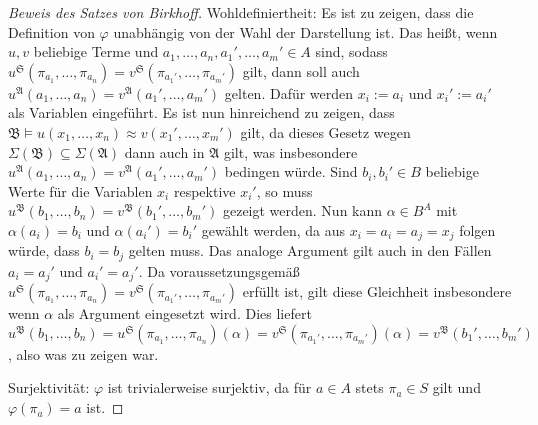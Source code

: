 \begin{proof}[Beweis des Satzes von Birkhoff]
    Wohldefiniertheit: Es ist zu zeigen, dass die Definition von $\varphi$ unabhängig von der Wahl der Darstellung ist.
    Das heißt, wenn $u,v$ beliebige Terme und $a_1,\ldots,a_n,a_1',\ldots,a_m'\in A$ sind, sodass $u^\mathfrak{S}(\pi_{a_1},\ldots,\pi_{a_n})=v^\mathfrak{S}(\pi_{a_1'},\ldots,\pi_{a_m'})$ gilt,
    dann soll auch $u^\mathfrak{A}(a_1,\ldots,a_n)=v^\mathfrak{A}(a_1',\ldots,a_m')$ gelten.
    Dafür werden $x_i:=a_i$ und $x_i':=a_i'$ als Variablen eingeführt. Es ist nun hinreichend zu zeigen, dass
    $\mathfrak{B}\models u(x_1,\ldots,x_n)\approx v(x_1',\ldots,x_m')$ gilt, da dieses Gesetz wegen $\Sigma(\mathfrak{B})\subseteq \Sigma(\mathfrak{A})$
    dann auch in $\mathfrak{A}$ gilt, was insbesondere $u^\mathfrak{A}(a_1,\ldots,a_n)=v^\mathfrak{A}(a_1',\ldots,a_m')$ bedingen würde.
    Sind $b_i,b_i'\in B$ beliebige Werte für die Variablen $x_i$ respektive $x_i'$, so muss $u^\mathfrak{B}(b_1,\ldots,b_n)=v^\mathfrak{B}(b_1',\ldots,b_m')$
    gezeigt werden. Nun kann $\alpha\in B^A$ mit $\alpha(a_i)=b_i$ und $\alpha(a_i')=b_i'$ gewählt werden,
    da aus $x_i=a_i=a_j=x_j$ folgen würde, dass $b_i=b_j$ gelten muss. Das analoge Argument gilt auch in den Fällen
    $a_i=a_j'$ und $a_i'=a_j'$. Da voraussetzungsgemäß $u^\mathfrak{S}(\pi_{a_1},\ldots,\pi_{a_n})=v^\mathfrak{S}(\pi_{a_1'},\ldots,\pi_{a_m'})$ erfüllt ist,
    gilt diese Gleichheit insbesondere wenn $\alpha$ als Argument eingesetzt wird. Dies liefert
    $u^\mathfrak{B}(b_1,\ldots,b_n)=u^\mathfrak{S}(\pi_{a_1},\ldots,\pi_{a_n})(\alpha)=v^\mathfrak{S}(\pi_{a_1'},\ldots,\pi_{a_m'})(\alpha)=v^\mathfrak{B}(b_1',\ldots,b_m')$,
    also was zu zeigen war.

    Surjektivität: $\varphi$ ist trivialerweise surjektiv, da für $a\in A$ stets $\pi_a\in S$ gilt und $\varphi(\pi_a)=a$ ist.


\end{proof}

